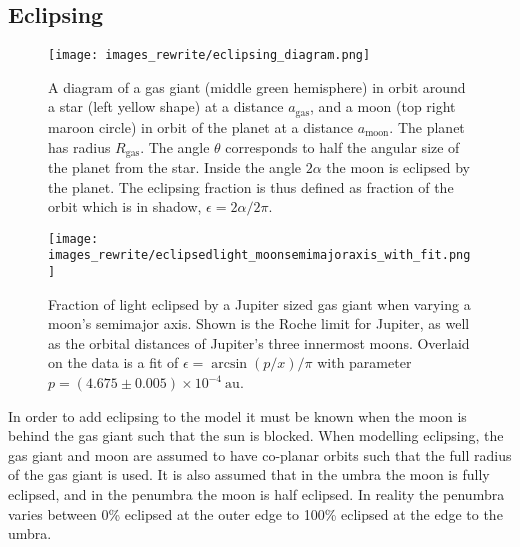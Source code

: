 \documentclass[12pt, onecolumn]{revtex4-2}    %
\begin{document}
\subsection{Eclipsing} \label{ssec:eclipsing}
%
\begin{figure}[t]
  \texttt{[image: images\_rewrite/eclipsing\_diagram.png]}
  \caption{
    A diagram of a gas giant (middle green hemisphere) in orbit around a star (left yellow shape) at a distance $a_{\text{gas}}$, and a moon (top right maroon circle) in orbit of the planet at a distance $a_{\text{moon}}$.
    The planet has radius $R_\text{gas}$.
    The angle $\theta$ corresponds to half the angular size of the planet from the star.
    Inside the angle $2\alpha$ the moon is eclipsed by the planet.
    The eclipsing fraction is thus defined as fraction of the orbit which is in shadow, $\epsilon = 2\alpha / 2\pi$.
  }
  \label{fig:quantitative_eclipsing}
\end{figure}

\begin{figure}[t]
  \texttt{[image: images\_rewrite/eclipsedlight\_moonsemimajoraxis\_with\_fit.png]}
  \caption{
    Fraction of light eclipsed by a Jupiter sized gas giant when varying a moon's semimajor axis.
    Shown is the Roche limit for Jupiter, as well as the orbital distances of Jupiter's three innermost moons.
    Overlaid on the data is a fit of $\epsilon = \arcsin(p/x)/\pi$ with parameter $p = (4.675\pm0.005)\times 10^{-4}\ \text{au}$.
  }
  \label{fig:quantitative_eclipsing_moon_semimajor_axis}
\end{figure}

In order to add eclipsing to the model it must be known when the moon is behind the gas giant such that the sun is blocked.
When modelling eclipsing, the gas giant and moon are assumed to have co-planar orbits such that the full radius of the gas giant is used.
It is also assumed that in the umbra the moon is fully eclipsed, and in the penumbra the moon is half eclipsed.
In reality the penumbra varies between 0\% eclipsed at the outer edge to 100\% eclipsed at the edge to the umbra.
\end{document}
